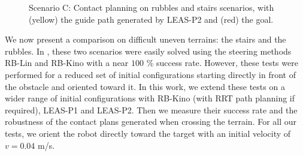 \begin{figure}[H]
\begin{subfigure}[t]{0.4\linewidth}
    \end{subfigure}
    \caption{Scenario C: Contact planning on rubbles and stairs scenarios, with (yellow) the guide path generated by LEAS-P2 and (red) the goal.}
    \label{fig:cp-sb:talos_stairs_rubbles_example}
\end{figure}
We now present a comparison on difficult uneven terrains: the stairs and the rubbles.
In \cite{AcyclicCP}, these two scenarios were easily solved using the steering methods RB-Lin and RB-Kino with a near $100$ \% success rate. 
However, these tests were performed for a reduced set of initial configurations starting directly in front of the obstacle and oriented toward it. 
In this work, we extend these tests on a wider range of initial configurations with RB-Kino (with RRT path planning if required), LEAS-P1 and LEAS-P2. Then we measure their success rate and the robustness of the contact plans generated when crossing the terrain.
For all our tests, we orient the robot directly toward the target with an initial velocity of $v=0.04$ m/s. \hfill \break

